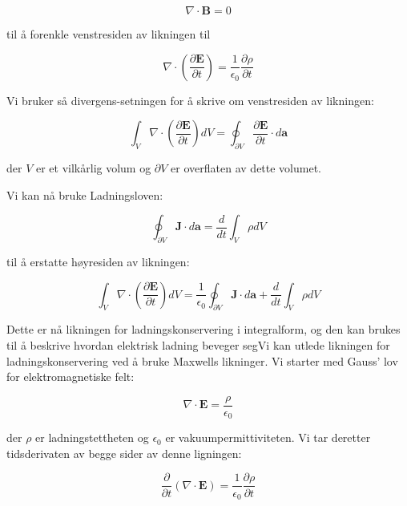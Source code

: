 \begin{equation*}
\nabla \cdot \mathbf{B} = 0
\end{equation*}

til å forenkle venstresiden av likningen til

\begin{equation*}
\nabla \cdot (\frac{\partial \mathbf{E}}{\partial t}) = \frac{1}{\epsilon_0}\frac{\partial \rho}{\partial t}
\end{equation*}

Vi bruker så divergens-setningen for å skrive om venstresiden av likningen:

\begin{equation*}
\int_V \nabla \cdot (\frac{\partial \mathbf{E}}{\partial t}) dV = \oint_{\partial V} \frac{\partial \mathbf{E}}{\partial t} \cdot d\mathbf{a}
\end{equation*}

der $V$ er et vilkårlig volum og $\partial V$ er overflaten av dette volumet.

Vi kan nå bruke Ladningsloven:

\begin{equation*}
\oint_{\partial V} \mathbf{J} \cdot d\mathbf{a} = \frac{d}{dt} \int_V \rho dV
\end{equation*}

til å erstatte høyresiden av likningen:

\begin{equation*}
\int_V \nabla \cdot (\frac{\partial \mathbf{E}}{\partial t}) dV = \frac{1}{\epsilon_0} \oint_{\partial V} \mathbf{J} \cdot d\mathbf{a} + \frac{d}{dt} \int_V \rho dV
\end{equation*}

Dette er nå likningen for ladningskonservering i integralform, og den kan brukes til å beskrive hvordan elektrisk ladning beveger segVi kan utlede likningen for ladningskonservering ved å bruke Maxwells likninger. Vi starter med Gauss' lov for elektromagnetiske felt:

\begin{equation*}
\nabla \cdot \mathbf{E} = \frac{\rho}{\epsilon_0}
\end{equation*}

der $\rho$ er ladningstettheten og $\epsilon_0$ er vakuumpermittiviteten. Vi tar deretter tidsderivaten av begge sider av denne ligningen:

\begin{equation*}
\frac{\partial}{\partial t}(\nabla \cdot \mathbf{E}) = \frac{1}{\epsilon_0}\frac{\partial \rho}{\partial t}
\end{equation*}

